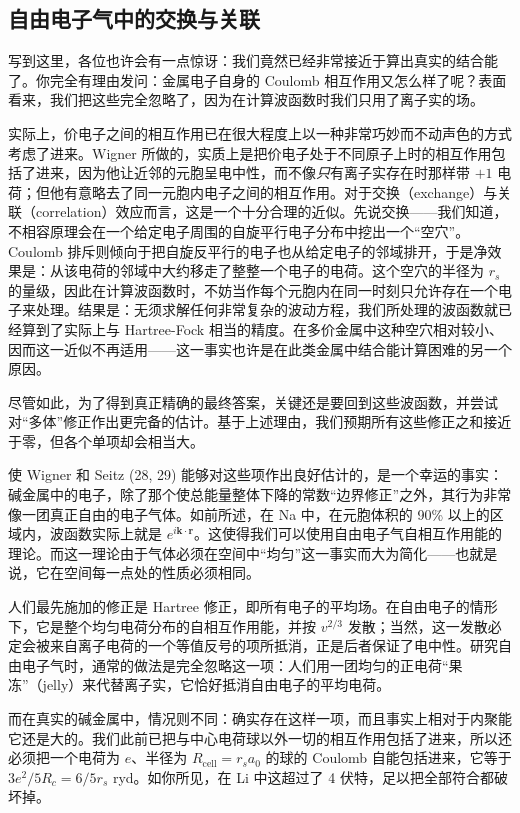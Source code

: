 
\subsection{自由电子气中的交换与关联}

写到这里，各位也许会有一点惊讶：我们竟然已经非常接近于算出真实的结合能了。你完全有理由发问：金属电子自身的 Coulomb 相互作用又怎么样了呢？表面看来，我们把这些完全忽略了，因为在计算波函数时我们只用了离子实的场。

实际上，价电子之间的相互作用已在很大程度上以一种非常巧妙而不动声色的方式考虑了进来。Wigner 所做的，实质上是把价电子处于不同原子上时的相互作用包括了进来，因为他让近邻的元胞呈电中性，而不像\emph{只}有离子实存在时那样带 $+1$ 电荷；但他有意略去了同一元胞内电子之间的相互作用。对于交换（exchange）与关联（correlation）效应而言，这是一个十分合理的近似。先说交换——我们知道，不相容原理会在一个给定电子周围的自旋平行电子分布中挖出一个“空穴”。Coulomb 排斥则倾向于把自旋反平行的电子也从给定电子的邻域排开，于是净效果是：从该电荷的邻域中大约移走了整整一个电子的电荷。这个空穴的半径为 $r_s$ 的量级，因此在计算波函数时，不妨当作每个元胞内在同一时刻只允许存在一个电子来处理。结果是：无须求解任何非常复杂的波动方程，我们所处理的波函数就已经算到了实际上与 Hartree-Fock 相当的精度。在多价金属中这种空穴相对较小、因而这一近似不再适用——这一事实也许是在此类金属中结合能计算困难的另一个原因。

尽管如此，为了得到真正精确的最终答案，关键还是要回到这些波函数，并尝试对“多体”修正作出更完备的估计。基于上述理由，我们预期所有这些修正之和接近于零，但各个单项却会相当大。

使 Wigner 和 Seitz (28, 29) 能够对这些项作出良好估计的，是一个幸运的事实：碱金属中的电子，除了那个使总能量整体下降的常数“边界修正”之外，其行为非常像一团真正自由的电子气体。如前所述，在 Na 中，在元胞体积的 90\% 以上的区域内，波函数实际上就是 $e^{i\mathbf{k}\cdot\mathbf{r}}$。这使得我们可以使用自由电子气自相互作用能的理论。而这一理论由于气体必须在空间中“均匀”这一事实而大为简化——也就是说，它在空间每一点处的性质必须相同。

人们最先施加的修正是 Hartree 修正，即所有电子的平均场。在自由电子的情形下，它是整个均匀电荷分布的自相互作用能，并按 $v^{2/3}$ 发散；当然，这一发散必定会被来自离子电荷的一个等值反号的项所抵消，正是后者保证了电中性。研究自由电子气时，通常的做法是完全忽略这一项：人们用一团均匀的正电荷“果冻”（jelly）来代替离子实，它恰好抵消自由电子的平均电荷。

而在真实的碱金属中，情况则不同：确实存在这样一项，而且事实上相对于内聚能它还是大的。我们此前已把与中心电荷球以外一切的相互作用包括了进来，所以还必须把一个电荷为 $e$、半径为 $R_{\mathrm{cell}} = r_s a_0$ 的球的 Coulomb 自能包括进来，它等于 $3e^2/5R_c = 6/5r_s$ ryd。如你所见，在 Li 中这超过了 4 伏特，足以把全部符合都破坏掉。

